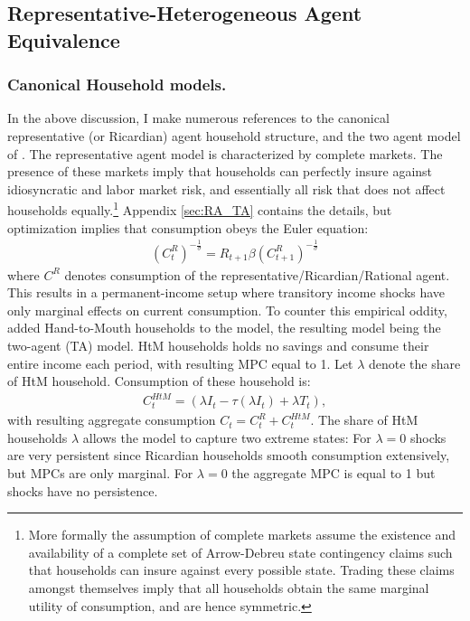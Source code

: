 \subsection{Representative-Heterogeneous Agent Equivalence} \label{sec:Aggre_result} %
\subsubsection{Canonical Household models.} In the above discussion, I make numerous references to the canonical representative (or Ricardian) agent household structure, and the two agent model of \citet{campbell1989consumption}. The representative agent model is characterized by complete markets. The presence of these markets imply that households can perfectly insure against idiosyncratic and labor market risk, and essentially all risk that does not affect households equally.\footnote{More formally the assumption of complete markets assume the existence and availability of a complete set of Arrow-Debreu state contingency claims such that households can insure against every possible state. Trading these claims amongst themselves imply that all households obtain the same marginal utility of consumption, and are hence symmetric.} Appendix \ref{sec:RA_TA} contains the details, but optimization implies that consumption obeys the Euler equation:
\begin{gather*}
\left(C_{t}^{R}\right)^{-\frac{1}{\sigma}}=R_{t+1}\beta\left(C_{t+1}^{R}\right)^{-\frac{1}{\sigma}}
\end{gather*}
where $C^R$ denotes consumption of the representative/Ricardian/Rational agent. This results in a permanent-income setup where transitory income shocks have only marginal effects on current consumption. To counter this empirical oddity, \citet{campbell1989consumption} added Hand-to-Mouth households to the model, the resulting model being the two-agent (TA) model. HtM households holds no savings and consume their entire income each period, with resulting MPC equal to 1. Let $\lambda$ denote the share of HtM household. Consumption of these household is: 
\begin{gather*}
C_{t}^{HtM}=\left(\lambda I_{t}-\tau\left(\lambda I_{t}\right)+\lambda T_{t}\right),
\end{gather*}
with resulting aggregate consumption $C_{t}=C_{t}^{R}+C_{t}^{HtM}$. The share of HtM households $\lambda$ allows the model to capture two extreme states: For $\lambda=0$ shocks are very persistent since Ricardian households smooth consumption extensively, but MPCs are only marginal. For $\lambda=0$ the aggregate MPC is equal to 1 but shocks have no persistence. 

